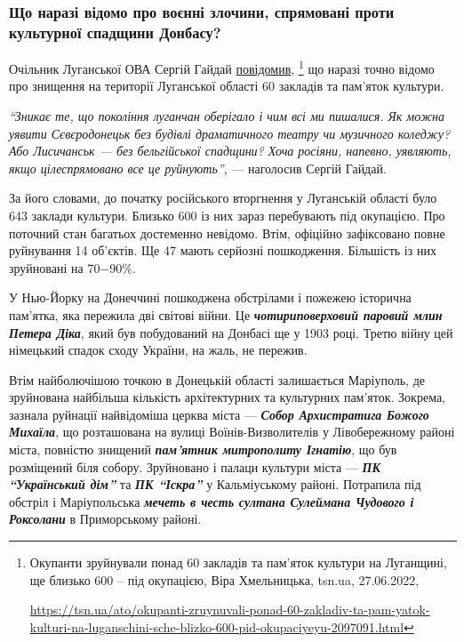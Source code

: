 \subsubsection{Що наразі відомо про воєнні злочини, спрямовані проти культурної спадщини Донбасу?}

Очільник Луганської ОВА Сергій Гайдай \href{https://tsn.ua/ato/okupanti-zruynuvali-ponad-60-zakladiv-ta-pam-yatok-kulturi-na-luganschini-sche-blizko-600-pid-okupaciyeyu-2097091.html}{повідомив},%
\footnote{Окупанти зруйнували понад 60 закладів та пам'яток культури на Луганщині, ще близько 600 – під окупацією, Віра Хмельницька, tsn.ua, 27.06.2022, \par\url{https://tsn.ua/ato/okupanti-zruynuvali-ponad-60-zakladiv-ta-pam-yatok-kulturi-na-luganschini-sche-blizko-600-pid-okupaciyeyu-2097091.html}}
що наразі точно відомо про
знищення на території Луганської області 60 закладів та пам'яток культури.

\begin{leftbar}
\emph{\enquote{Зникає те, що покоління луганчан оберігало і чим всі ми пишалися. Як можна
уявити Сєвєродонецьк без будівлі драматичного театру чи музичного
коледжу? Або Лисичанськ — без бельгійської спадщини? Хоча росіяни,
напевно, уявляють, якщо цілеспрямовано все це руйнують}}, — наголосив
Сергій Гайдай.
\end{leftbar}

За його словами, до початку російського вторгнення у Луганській області було
643 заклади культури. Близько 600 із них зараз перебувають під окупацією. Про
поточний стан багатьох достеменно невідомо. Втім, офіційно зафіксовано повне
руйнування 14 об'єктів. Ще 47 мають серйозні пошкодження. Більшість із них
зруйновані на 70−90\%.


У Нью-Йорку на Донеччині пошкоджена обстрілами і пожежею історична пам'ятка,
яка пережила дві світові війни. Це \emph{\textbf{чотириповерховий паровий млин Петера Діка}},
який був побудований на Донбасі ще у 1903 році. Третю війну цей німецький
спадок сходу України, на жаль, не пережив.


Втім найболючішою точкою в Донецькій області залишається Маріуполь, де
зруйнована найбільша кількість архітектурних та культурних пам'яток. Зокрема,
зазнала руйнації найвідоміша церква міста — \emph{\textbf{Собор Архистратига Божого Михаїла}},
що розташована на вулиці Воїнів-Визволителів у Лівобережному районі міста,
повністю знищений \emph{\textbf{пам'ятник митрополиту Ігнатію}}, що був розміщений біля собору.
Зруйновано і палаци культури міста — \textbf{\emph{ПК \enquote{Український дім}}} та \textbf{\emph{ПК \enquote{Іскра}}} у
Кальміуському районі. Потрапила під обстріл і Маріупольська \emph{\textbf{мечеть в честь
султана Сулеймана Чудового і Роксолани}} в Приморському районі.

